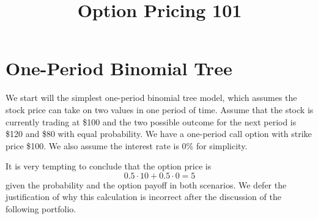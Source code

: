\documentclass{article}
\begin{document}
\title{Option Pricing 101}
\date{}
\maketitle


\section{One-Period Binomial Tree}
We start will the simplest one-period binomial tree model, which assumes the stock price can take on two values in one period of time. Assume that the stock is currently trading at \$100 and the two possible outcome for the next period is \$120 and \$80 with equal probability. We have a one-period call option with strike price \$100. We also assume the interest rate is 0\% for simplicity.
\begin{center}
    

\end{center}

It is very tempting to conclude that the option price is $$0.5\cdot 10 + 0.5 \cdot 0 = 5$$ given the probability and the option payoff in both scenarios. We defer the justification of why this calculation is incorrect after the discussion of the following portfolio.\\
\end{document}
